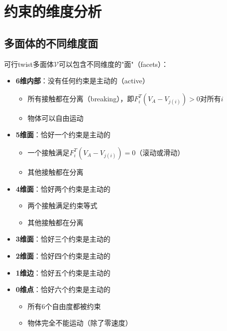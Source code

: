 \documentclass[12pt,a4paper]{article}
\begin{document}
\section{约束的维度分析}

\subsection{多面体的不同维度面}

可行twist多面体$\mathcal{V}$可以包含不同维度的"面"（facets）：

\begin{itemize}
\item \textbf{6维内部}：没有任何约束是主动的（active）
  \begin{itemize}
  \item 所有接触都在分离（breaking），即$F_i^T (V_A - V_{j(i)}) > 0$对所有$i$
  \item 物体可以自由运动
  \end{itemize}

\item \textbf{5维面}：恰好一个约束是主动的
  \begin{itemize}
  \item 一个接触满足$F_i^T (V_A - V_{j(i)}) = 0$（滚动或滑动）
  \item 其他接触都在分离
  \end{itemize}

\item \textbf{4维面}：恰好两个约束是主动的
  \begin{itemize}
  \item 两个接触满足约束等式
  \item 其他接触都在分离
  \end{itemize}

\item \textbf{3维面}：恰好三个约束是主动的

\item \textbf{2维面}：恰好四个约束是主动的

\item \textbf{1维边}：恰好五个约束是主动的

\item \textbf{0维点}：恰好六个约束是主动的
  \begin{itemize}
  \item 所有6个自由度都被约束
  \item 物体完全不能运动（除了零速度）
  \end{itemize}
\end{itemize}
\end{document}
